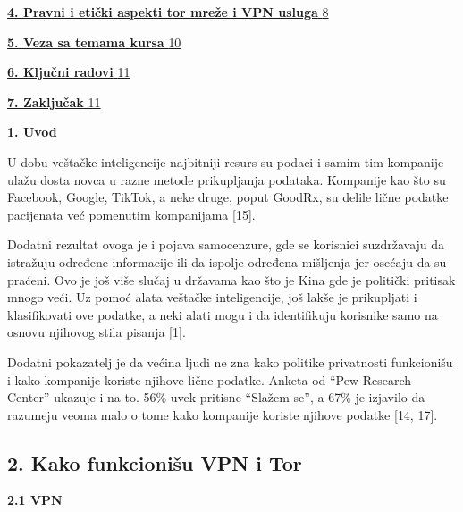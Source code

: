 \documentclass[
]{article}
\begin{document}
\protect\hyperlink{pravni-i-etiux10dki-aspekti-tor-mreux17ee-i-vpn-usluga}{\textbf{4.
Pravni i etički aspekti tor mreže i VPN usluga}
\protect\hyperlink{pravni-i-etiux10dki-aspekti-tor-mreux17ee-i-vpn-usluga}{8}}

\protect\hyperlink{_Toc234141050}{\textbf{5. Veza sa temama kursa}
\protect\hyperlink{_Toc234141050}{10}}

\protect\hyperlink{_Toc234141051}{\textbf{6. Ključni radovi}
\protect\hyperlink{_Toc234141051}{11}}

\protect\hyperlink{_Toc234141052}{\textbf{7. Zaključak}
\protect\hyperlink{_Toc234141052}{11}}

\textbf{\hfill\break
}

\protect\hypertarget{_Toc234141038}{}{}\textbf{1. Uvod}

U dobu veštačke inteligencije najbitniji resurs su podaci i samim tim
kompanije ulažu dosta novca u razne metode prikupljanja podataka.
Kompanije kao što su Facebook, Google, TikTok, a neke druge, poput
GoodRx, su delile lične podatke pacijenata već pomenutim kompanijama
{[}15{]}.

Dodatni rezultat ovoga je i pojava samocenzure, gde se korisnici
suzdržavaju da istražuju određene informacije ili da ispolje određena
mišljenja jer osećaju da su praćeni. Ovo je još više slučaj u državama
kao što je Kina gde je politički pritisak mnogo veći. Uz pomoć alata
veštačke inteligencije, još lakše je prikupljati i klasifikovati ove
podatke, a neki alati mogu i da identifikuju korisnike samo na osnovu
njihovog stila pisanja {[}1{]}.

Dodatni pokazatelj je da većina ljudi ne zna kako politike privatnosti
funkcionišu i kako kompanije koriste njihove lične podatke. Anketa od
``Pew Research Center'' ukazuje i na to. 56\% uvek pritisne ``Slažem
se'', a 67\% je izjavilo da razumeju veoma malo o tome kako kompanije
koriste njihove podatke {[}14, 17{]}.

\hypertarget{kako-funkcioniux161u-vpn-i-tor}{%
\subsection{2. Kako funkcionišu VPN i
Tor}\label{kako-funkcioniux161u-vpn-i-tor}}

\protect\hypertarget{_Toc234141040}{}{}\textbf{2.1 VPN}
\end{document}
